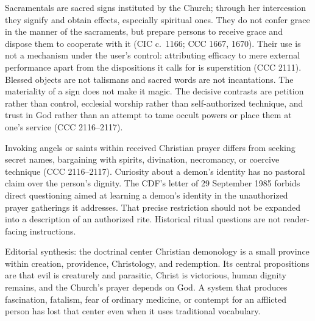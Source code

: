 Sacramentals are sacred signs instituted by the Church; through her
intercession they signify and obtain effects, especially spiritual ones. They
do not confer grace in the manner of the sacraments, but prepare persons to
receive grace and dispose them to cooperate with it (CIC c.~1166; CCC 1667,
1670). Their use is not a mechanism under the user's control: attributing
efficacy to mere external performance apart from the dispositions it calls for
is superstition (CCC 2111). Blessed objects are not talismans and sacred words
are not incantations. The materiality of a sign does not make it magic. The
decisive contrasts are petition rather than control, ecclesial worship rather
than self-authorized technique, and trust in God rather than an attempt to tame
occult powers or place them at one's service (CCC 2116--2117).

Invoking angels or saints within received Christian prayer differs from
seeking secret names, bargaining with spirits, divination, necromancy, or
coercive technique (CCC 2116--2117). Curiosity about a demon's identity has no
pastoral claim over the person's dignity. The CDF's letter of 29 September
1985 forbids direct questioning aimed at learning a demon's identity in the
unauthorized prayer gatherings it addresses. That precise restriction should
not be expanded into a description of an authorized rite. Historical ritual
questions are not reader-facing instructions.

\begin{studybox}{Editorial synthesis: the doctrinal center}
Christian demonology is a small province within creation, providence,
Christology, and redemption. Its central propositions are that evil is
creaturely and parasitic, Christ is victorious, human dignity remains, and the
Church's prayer depends on God. A system that produces fascination, fatalism,
fear of ordinary medicine, or contempt for an afflicted person has lost that
center even when it uses traditional vocabulary.
\end{studybox}
